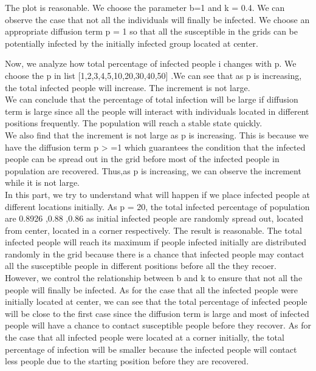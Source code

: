 \documentclass{article}
\begin{document}
The plot is reasonable. We choose the parameter b=1 and k = 0.4. We can observe the case that not all the individuals will finally be infected. We choose an appropriate diffusion term p = 1 so that all the susceptible in the grids can be potentially infected by the initially infected group located at center.

Now, we analyze how total percentage of infected people i changes with p. We choose the p in list [1,2,3,4,5,10,20,30,40,50] .We can see that as p is increasing, the total infected people will increase. The increment is not large.\\
 We can conclude that the percentage of total infection will be large if diffusion term is large since all the people will interact with individuals located in different positions frequently. The population will reach a stable state quickly. \\
 We also find that the increment is not large as p is increasing. This is because we have the diffusion term p > =1 which guarantees the condition that the infected people can be spread out in the grid before most of the infected people in population are recovered.
 Thus,as p is increasing, we can observe the increment while it is not large.\\

 In this part, we try to understand what will happen if we place infected people at different locations initially. As p = 20, the total infected percentage of population are 0.8926 ,0.88 ,0.86 as initial infected people are randomly spread out, located from center, located in a corner respectively. The result is reasonable. The total infected people will reach its maximum if people infected initially are distributed randomly in the grid because there is a chance that infected people may contact all the susceptible people in different positions before all the they recoer. However, we control the relationship between b and k to ensure that not all the people will finally be infected.
 As for the case that all the infected people were initially located at center, we can see that the total percentage of infected people will be close to the first case since the diffusion term is large  and most of infected people will have a chance to contact susceptible people before they recover. As for the case that all infected people were located at a corner initially, the total percentage of infection will be smaller because the infected people will contact less people due to the starting position before they are recovered.
\end{document}
